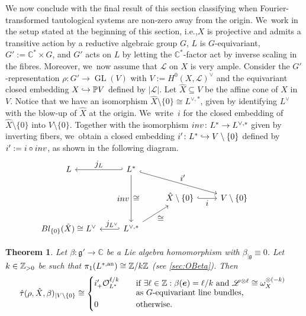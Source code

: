 \documentclass[11pt]{article}
\newcommand{\ie}{i.e.,\xspace}
\let\mathds\mathbb
\let\ts\textstyle
\newcommand\hto{\mathrel{\lhook\joinrel\to}}
\newcommand{\bme}{{\boldsymbol{e}}}
\newtheorem{thm}{Theorem}[section]
\newcommand{\dC}{{\mathds C}}\let\C\dC
\newcommand{\Ell}{\mathscr{L}}
\newcommand{\frg}{\mathfrak{g}}
\newcommand\restr[2]{{#1_{| {#2}}}}
\begin{document}
We now conclude with the final result of this section classifying when Fourier-transformed tautological systems are non-zero away from the origin. We~work in the setup stated at the beginning of this section, \ie $X$ is projective and admits a transitive action by a reductive algebraic group $G$, $L$ is $G$-equivariant,
$G':=\dC^*\times G$, and $G'$ acts on $L$ by letting the $\dC^*$-factor act by inverse scaling in the fibres.
Moreover, we~now assume that $\Ell$ on $X$ is very ample. Consider the $G'$-representation $\rho \colon G' \to \operatorname{GL}(V)$ with $V := H^0(X,\Ell)^\vee$ and the equivariant closed embedding $X \hto \P V$ defined by $|\Ell|$. Let $\hat X \subseteq V$ be the affine cone of $X$ in $V$. Notice that we have an isomorphism $\hat{X} \setminus \{0\} \cong L^{\vee,*}$, given by identifying $L^{\vee}$ with the blow-up of $\hat X$ at the origin. We~write~$i$ for the closed embedding of $\hat{X}\setminus \{0\}$ into $V\setminus \{0\}$. Together with the isomorphism $\textup{inv} \colon L^* \to L^{\vee,*}$ given by inverting fibers, we~obtain a closed embedding $i' \colon L^* \hto V \setminus \{0\}$ defined by $i':=i \circ \textup{inv}$, as shown in the following diagram.
\begin{equation}\label{diag:Maps}
\begin{tikzcd}
L & L^*\ar[swap,hook']{l}{\ts j_L} \ar[swap]{dd}{\ts \textup{inv}}[swap]{\ts \cong} \ar[hook]{rrd}{\ts i'} & & & \\
&&\hat{X} \setminus \{0\} \ar[hook]{r}[swap]{\ts i} & V \setminus \{0\} \\
\textup{Bl}_{\{0\}}(\hat{X})\cong L^\vee& L^{\vee,*}\ar[hook']{l}[swap]{\ts \;\;j_{L^\vee}} \ar[swap]{ur}{\ts \cong}
&&&
\end{tikzcd}
\end{equation}

\begin{thm} \label{thm:restrictedTauHatDescription}
Let
$\beta \colon \frg' \to \C$ be a Lie algebra homomorphism with $\restr{\beta}{\frg} \equiv 0$. Let $k \in \Z_{>0}$ be such that $\pi_1(L^{*,\mathrm{an}}) \cong \Z/k\Z$ (see \cref{sec:OBeta}). Then
\[
\restr{\hat{\tau}(\rho, \hat{X}, \beta)}{V \setminus \{0\}} \cong
\begin{cases}
i'_+ \O_{L^*}^{\ell/k} & \quad\text{if $\exists \ell \in \Z: \beta(\bme) = \ell/k$ and $\Ell^{\otimes \ell} \cong \omega_X^{\otimes (-k)}$ } \\[-3pt]
& \quad\text{as $G$-equivariant line bundles,} \\
0 & \quad\text{otherwise.}
\end{cases}
\]
\end{thm}
\end{document}

